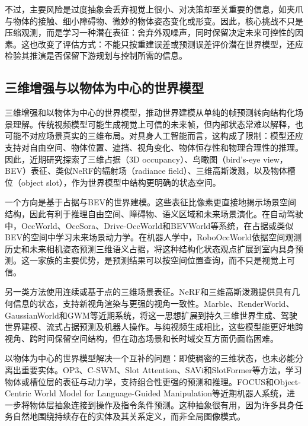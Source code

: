 不过，主要风险是过度抽象会丢弃视觉上很小、对决策却至关重要的信息，如夹爪与物体的接触、细小障碍物、微妙的物体姿态变化或形变。因此，核心挑战不只是压缩观测，而是学习一种潜在表征：舍弃外观噪声，同时保留决定未来可控性的因素。这也改变了评估方式：不能只按重建误差或预测误差评价潜在世界模型，还应检验其推演是否保留下游规划与控制所需的信息。

\subsection{三维增强与以物体为中心的世界模型}
三维增强和以物体为中心的世界模型，推动世界建模从单纯的帧预测转向结构化场景理解。传统视频模型可能生成视觉上可信的未来帧，但内部状态常难以解释，也可能不对应场景真实的三维布局。对具身人工智能而言，这构成了限制：模型还应支持对自由空间、物体位置、遮挡、视角变化、物体恒存性和物理合理性的推理。因此，近期研究探索了三维占据（3D occupancy）、鸟瞰图（bird's-eye view，BEV）表征、类似NeRF的辐射场（radiance field）、三维高斯泼溅，以及物体槽位（object slot），作为世界模型中结构更明确的状态空间\citep{mildenhall2020nerf,kerbl20233dgaussians,locatello2020slotattention,wu2023slotformer,zheng2024occworld,zhang2024bevworld,zhang2025robooccworld}。

一个方向是基于占据与BEV的世界建模。这些表征比像素更直接地揭示场景空间结构，因此有利于推理自由空间、障碍物、语义区域和未来场景演化。在自动驾驶中，OccWorld、OccSora、Drive-OccWorld和BEVWorld等系统，在占据或类似BEV的空间中学习未来场景动力学\citep{zheng2024occworld,wang2024occsora,yang2024driveoccworld,zhang2024bevworld}。在机器人学中，RoboOccWorld依据空间观测历史和未来相机姿态预测三维语义占据，将这种结构化状态观点扩展到室内具身预测\citep{zhang2025robooccworld}。这一家族的主要优势，是预测结果可以按空间位置查询，而不只是视觉上可信。

另一类方法使用连续或基于点的三维场景表征。NeRF和三维高斯泼溅提供具有几何信息的状态，支持新视角渲染与更强的视角一致性\citep{mildenhall2020nerf,kerbl20233dgaussians}。Marble、RenderWorld、GaussianWorld和GWM等近期系统，将这一思想扩展到持久三维世界生成、驾驶世界建模、流式占据预测及机器人操作\citep{worldlabs2025marble,yan2024renderworld,zuo2025gaussianworld,lu2025gwm}。与纯视频生成相比，这些模型能更好地跨视角、跨时间保留空间结构，但在动态场景和长时域交互方面仍面临困难。

以物体为中心的世界模型解决一个互补的问题：即使稠密的三维状态，也未必能分离出重要实体。OP3、C-SWM、Slot Attention、SAVi和SlotFormer等方法，学习物体或槽位层的表征与动力学，支持组合性更强的预测和推理\citep{veerapaneni2019op3,kipf2019contrastive,locatello2020slotattention,kipf2022savi,wu2023slotformer}。FOCUS和Object-Centric World Model for Language-Guided Manipulation等近期机器人系统，进一步将物体层抽象连接到操作及指令条件预测\citep{ferraro2023focus,jeong2025objectcentricwm}。这种抽象很有用，因为许多具身任务自然地围绕持续存在的实体及其关系定义，而非全局图像模式。

